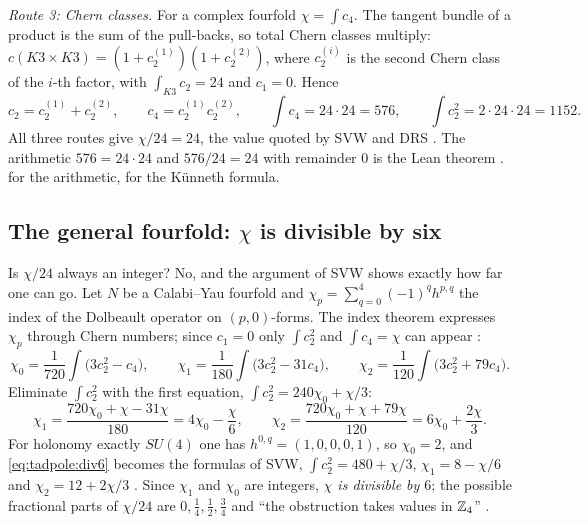 \emph{Route 3: Chern classes.} For a complex fourfold $\chi=\int c_4$. The tangent bundle of
a product is the sum of the pull-backs, so total Chern classes multiply:
$c(K3\times K3)=(1+c_2^{(1)})(1+c_2^{(2)})$, where $c_2^{(i)}$ is the second Chern class of
the $i$-th factor, with $\int_{K3}c_2=24$ and $c_1=0$. Hence
\begin{equation}\label{eq:tadpole:chern}
 c_2=c_2^{(1)}+c_2^{(2)},\qquad c_4=c_2^{(1)}c_2^{(2)},\qquad
 \int c_4=24\cdot24=576,\qquad \int c_2^2=2\cdot24\cdot24=1152 .
\end{equation}
All three routes give $\chi/24=24$, the value quoted by SVW and DRS
. The arithmetic
$576=24\cdot24$ and $576/24=24$ with remainder $0$ is the Lean theorem
. \TA{} for the arithmetic, \TL{} for the K\"unneth formula.

\subsection{The general fourfold: \texorpdfstring{$\chi$}{chi} is divisible by six}
Is $\chi/24$ always an integer? No, and the argument of SVW shows exactly how far one can
go. Let $N$ be a Calabi--Yau fourfold and
$\chi_p=\sum_{q=0}^{4}(-1)^qh^{p,q}$ the index of the Dolbeault operator on $(p,0)$-forms.
The index theorem expresses $\chi_p$ through Chern numbers; since $c_1=0$ only
$\int c_2^2$ and $\int c_4=\chi$ can appear :
\begin{equation}\label{eq:tadpole:todd}
 \chi_0=\frac{1}{720}\int\bigl(3c_2^2-c_4\bigr),\qquad
 \chi_1=\frac{1}{180}\int\bigl(3c_2^2-31c_4\bigr),\qquad
 \chi_2=\frac{1}{120}\int\bigl(3c_2^2+79c_4\bigr).
\end{equation}
Eliminate $\int c_2^2$ with the first equation, $\int c_2^2=240\chi_0+\chi/3$:
\begin{equation}\label{eq:tadpole:div6}
 \chi_1=\frac{720\chi_0+\chi-31\chi}{180}=4\chi_0-\frac{\chi}{6},\qquad
 \chi_2=\frac{720\chi_0+\chi+79\chi}{120}=6\chi_0+\frac{2\chi}{3}.
\end{equation}
For holonomy exactly $SU(4)$ one has $h^{0,q}=(1,0,0,0,1)$, so $\chi_0=2$, and
\eqref{eq:tadpole:div6} becomes the formulas of SVW, $\int c_2^2=480+\chi/3$,
$\chi_1=8-\chi/6$ and $\chi_2=12+2\chi/3$ . Since $\chi_1$ and
$\chi_0$ are integers, \emph{$\chi$ is divisible by $6$}; the possible fractional parts of
$\chi/24$ are $0,\tfrac14,\tfrac12,\tfrac34$ and ``the obstruction takes values in $\mathbb{Z}_4$''
. \TL

